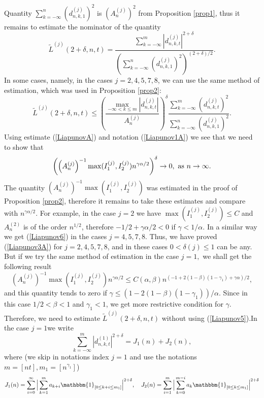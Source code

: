 \documentclass[12pt]{article}
\def\a{\alpha}
\def\b{\beta}
\def\d{\delta}
\def\g{\gamma}
\newcommand{\ind}[1]{\mathbbm{1}_{#1}}
\theoremstyle{plain}
\theoremstyle{definition}
\begin{document}
Quantity $\sum_{k=-\infty}^n (d_{n,k,1}^{(j)})^2$ is $(A_n^{(j)})^2$ from Proposition \ref{prop1}, thus it remains to estimate the nominator of the  quantity
$$
{\tilde L}^{(j)}(2+\d,n, t)=\frac{\sum_{k=-\infty}^m |d_{n,k,t}^{(j)}|^{2+\d}}{\left (\sum_{k=-\infty}^n (d_{n,k,1}^{(j)})^2\right )^{(2+\d)/2}}.
$$
In some cases, namely, in the cases $j=2, 4, 5, 7, 8$, we can use the same method of estimation, which was used in Proposition \ref{prop2}:
\begin{equation}\label{Liapunov5}
{\tilde L}^{(j)}(2+\d,n, t)\le \left (\frac{\max_{-\infty<k\le m} |d_{n,k,t}^{(j)}|}{A_n^{(j)}}\right )^{\d}\frac{\sum_{k=-\infty}^m (d_{n,k,t}^{(j)})^2}{\sum_{k=-\infty}^n (d_{n,k,1}^{(j)})^2}.
\end{equation}
Using estimate (\ref{LiapunovA}) and notation (\ref{Liapunov1A}) we see that we need to show that
\begin{equation}\label{Liapunov6}
\left ( \left (A_n^{(j)} \right )^{-1}\max (I_1^{(j)}, I_2^{(j)})n^{\g \a /2}\right)^\d \to 0, \ {\rm as} \ n\to \infty.
\end{equation}
The quantity $\left (A_n^{(j)} \right )^{-1}\max (I_1^{(j)}, I_2^{(j)})$ was estimated in the proof of Proposition \ref{prop2}, therefore it remains to  take these estimates  and compare with $n^{\g \a /2}$. For example, in the case $j=2$ we have $\max (I_1^{(j)}, I_2^{(j)})\le C$ and $A_n^{(2)}$ is of the order $n^{1/2}$, therefore $-1/2 +\g \a /2<0$ if $\g<1/\a$. In a similar way we get (\ref{Liapunov6}) in the cases $j=4, 5, 7, 8$. Thus, we have proved (\ref{Liapunov3A}) for $j=2, 4, 5, 7, 8$, and in these cases $0<\d(j)\le 1$ can be any. But if we try the same method of estimation in the case $j=1,$ we shall get the following result
$$
 \left (A_n^{(j)} \right )^{-1}\max (I_1^{(j)}, I_2^{(j)})n^{\g \a /2}\le C(\a, \b)n^{(-1+2(1-\b)(1-\g_1)+\g\a)/2},
$$
and this quantity tends to zero if $\g\le (1-2(1-\b)(1-\g_1))/\a$. Since in this case $1/2<\b<1$ and $\g_1<1$,  we get more restrictive condition for $\g$. Therefore, we need to estimate ${\tilde L}^{(j)}(2+\d,n, t)$ without using (\ref{Liapunov5}).In the case $j=1$we write
\begin{equation}\label{Jn12}
\sum_{k=-\infty}^m |d_{n,k,t}^{(1)}|^{2+\d}=J_1(n)+J_2(n),
\end{equation}
where (we skip in notations index $j=1$ and use the notations $m=[nt], m_1=[n^{\g_1}]$)
$$
J_1(n)=\sum_{i=0}^\infty \Big | \sum_{k=1}^m a_{k+i}\ind{[0\le k+i\le m_1]} \Big |^{2+\d}, \quad  J_2(n)=\sum_{i=1}^m \Big |\sum_{k=0}^{m-i} a_{k}\ind{[0\le k\le m_1]} \Big |^{2+\d}
$$
\end{document}
